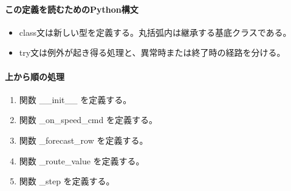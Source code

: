 \documentclass[a4paper,11pt]{article}
\begin{document}
            \paragraph{この定義を読むためのPython構文}
            \begin{itemize}[leftmargin=1.6em]
            \item class文は新しい型を定義する。丸括弧内は継承する基底クラスである。
\item try文は例外が起き得る処理と、異常時または終了時の経路を分ける。
            \end{itemize}
            \paragraph{上から順の処理}
            \begin{enumerate}[leftmargin=1.8em]
            \item 関数 \_\_init\_\_ を定義する。
\item 関数 \_on\_speed\_cmd を定義する。
\item 関数 \_forecast\_row を定義する。
\item 関数 \_route\_value を定義する。
\item 関数 \_step を定義する。
            \end{enumerate}
\end{document}
